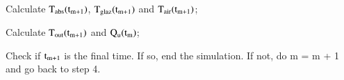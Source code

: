 \begin{description}[before={\setcounter{descriptcount}{0}},font=\bfseries\stepcounter{descriptcount}\thedescriptcount~]
	\item Calculate $\rm{T_{abs}}(t_{m+1})$, $\rm{T_{glaz}}(t_{m+1})$ and $\rm{T_{air}}(t_{m+1})$;
	\item Calculate $\rm{T_{out}}(t_{m+1})$ and $\rm{Q_u}(t_m)$;
	\item Check if $\rm{t_{m+1}}$ is the final time. If so, end the simulation. If not, do m = m + 1 and go back to step 4.
\end{description}


